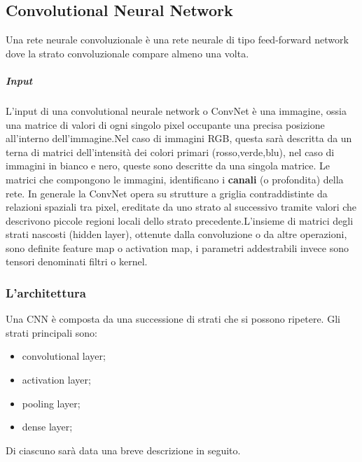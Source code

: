 \documentclass[14pt]{extarticle}
\begin{document}
\subsection{Convolutional Neural Network}
Una rete neurale convoluzionale è una rete neurale di tipo feed-forward network dove la strato convoluzionale compare almeno una volta.
\subparagraph{Input}
L'input di una convolutional neurale network o ConvNet è una immagine, ossia una matrice di valori di ogni singolo pixel occupante una precisa posizione all'interno dell'immagine.Nel caso di immagini RGB, questa sarà descritta da un terna di matrici dell'intensità dei colori primari (rosso,verde,blu), nel caso di immagini in bianco e nero, queste sono descritte da una singola matrice. Le matrici che compongono le immagini, identificano i \textbf{canali} (o profondita) della rete. %
In generale la ConvNet opera su strutture a griglia contraddistinte da relazioni spaziali tra pixel, ereditate da uno strato al successivo tramite valori che descrivono
piccole regioni locali dello strato precedente.L’insieme di matrici degli strati nascosti (hidden layer), ottenute dalla convoluzione o da altre operazioni, sono definite feature map o activation map, i parametri addestrabili invece sono tensori denominati filtri o kernel.\cite{torresin2019sviluppo}
\subsubsection{L'architettura} 
Una CNN è composta da una successione di strati che si possono ripetere.
 Gli strati principali sono:
\begin{itemize}
\item convolutional layer;
\item activation layer;
\item pooling layer;
\item dense layer;
\end{itemize}
\cite{torresin2019sviluppo}
Di ciascuno sarà data una breve descrizione in seguito.
\end{document}
